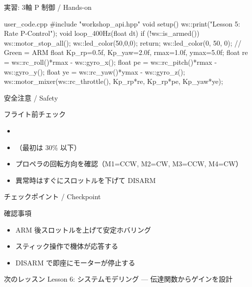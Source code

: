 \begin{frame}[fragile]{実習: 3軸 P 制御 / Hands-on}
  \begin{sflisting}[basicstyle=\ttfamily\scriptsize]{user\_code.cpp}
#include "workshop_api.hpp"
void setup() { ws::print("Lesson 5: Rate P-Control"); }
void loop_400Hz(float dt) {
    if (!ws::is_armed()) {
        ws::motor_stop_all(); ws::led_color(50,0,0); return;
    }
    ws::led_color(0, 50, 0);  // Green = ARM
    float Kp_rp=0.5f, Kp_yaw=2.0f, rmax=1.0f, ymax=5.0f;
    float re = ws::rc_roll()*rmax  - ws::gyro_x();
    float pe = ws::rc_pitch()*rmax - ws::gyro_y();
    float ye = ws::rc_yaw()*ymax   - ws::gyro_z();
    ws::motor_mixer(ws::rc_throttle(),
        Kp_rp*re, Kp_rp*pe, Kp_yaw*ye);
}
  \end{sflisting}
\end{frame}

\begin{frame}{安全注意 / Safety}
  \begin{alertblock}{フライト前チェック}
    \begin{itemize}
      \item[$\square$] 
      \item[$\square$] （最初は 30\% 以下）
      \item[$\square$] プロペラの回転方向を確認（M1=CCW, M2=CW, M3=CCW, M4=CW）
      \item[$\square$] 異常時はすぐにスロットルを下げて DISARM
    \end{itemize}
  \end{alertblock}
\end{frame}

\begin{frame}{チェックポイント / Checkpoint}
  \begin{alertblock}{確認事項}
    \begin{itemize}
      \item[$\square$] ARM 後スロットルを上げて安定ホバリング
      \item[$\square$] スティック操作で機体が応答する
      \item[$\square$] DISARM で即座にモーターが停止する
    \end{itemize}
  \end{alertblock}

  \vspace{1em}

  \begin{block}{次のレッスン}
    Lesson 6: システムモデリング --- 伝達関数からゲインを設計
  \end{block}
\end{frame}
